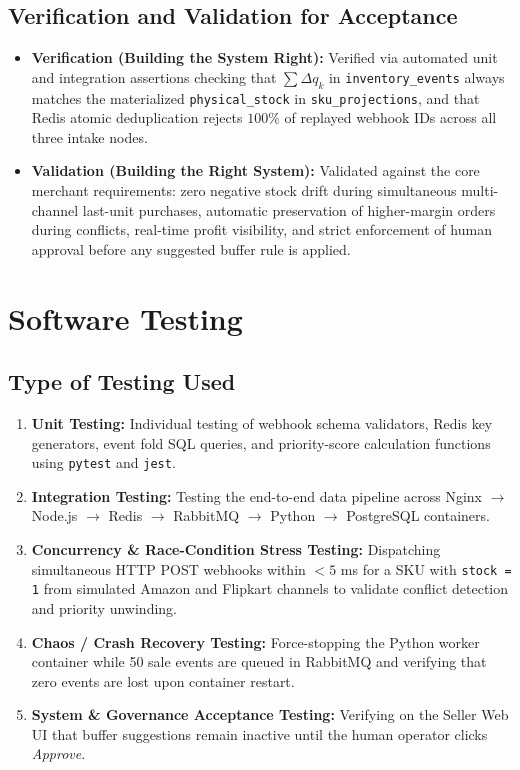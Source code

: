 \documentclass[oneside,a4paper,12pt]{report}
\begin{document}
\section{Verification and Validation for Acceptance}
\begin{itemize}
  \item \textbf{Verification (Building the System Right):} Verified via automated unit and integration assertions checking that $\sum \Delta q_k$ in \texttt{inventory\_events} always matches the materialized \texttt{physical\_stock} in \texttt{sku\_projections}, and that Redis atomic deduplication rejects $100\%$ of replayed webhook IDs across all three intake nodes.
  \item \textbf{Validation (Building the Right System):} Validated against the core merchant requirements: zero negative stock drift during simultaneous multi-channel last-unit purchases, automatic preservation of higher-margin orders during conflicts, real-time profit visibility, and strict enforcement of human approval before any suggested buffer rule is applied.
\end{itemize}

\chapter{Software Testing}

\section{Type of Testing Used}
\begin{enumerate}
  \item \textbf{Unit Testing:} Individual testing of webhook schema validators, Redis key generators, event fold SQL queries, and priority-score calculation functions using \texttt{pytest} and \texttt{jest}.
  \item \textbf{Integration Testing:} Testing the end-to-end data pipeline across Nginx $\rightarrow$ Node.js $\rightarrow$ Redis $\rightarrow$ RabbitMQ $\rightarrow$ Python $\rightarrow$ PostgreSQL containers.
  \item \textbf{Concurrency \& Race-Condition Stress Testing:} Dispatching simultaneous HTTP POST webhooks within $<5$ ms for a SKU with \texttt{stock = 1} from simulated Amazon and Flipkart channels to validate conflict detection and priority unwinding.
  \item \textbf{Chaos / Crash Recovery Testing:} Force-stopping the Python worker container while 50 sale events are queued in RabbitMQ and verifying that zero events are lost upon container restart.
  \item \textbf{System \& Governance Acceptance Testing:} Verifying on the Seller Web UI that buffer suggestions remain inactive until the human operator clicks \textit{Approve}.
\end{enumerate}
\end{document}
